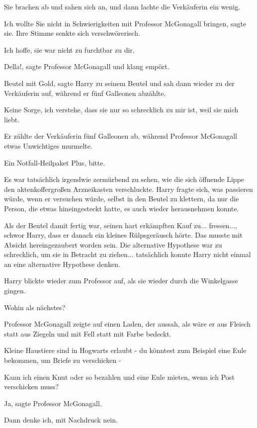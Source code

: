 Sie brachen ab und sahen sich an, und dann lachte die Verkäuferin ein wenig.

\glqq{}Ich wollte Sie nicht in Schwierigkeiten mit Professor McGonagall
bringen\grqq{}, sagte sie. Ihre Stimme senkte sich verschwörerisch.

\glqq{}Ich hoffe, sie war nicht zu furchtbar zu dir.\grqq{}

\glqq{}Della!\grqq{}, sagte Professor McGonagall und klang empört.

\glqq{}Beutel mit Gold\grqq{}, sagte Harry zu seinem Beutel und sah dann wieder
zu der Verkäuferin auf, während er fünf Galleonen abzählte.

\glqq{}Keine Sorge, ich verstehe, dass sie nur so schrecklich zu mir ist, weil
sie mich liebt.\grqq{}

Er zählte der Verkäuferin fünf Galleonen ab, während Professor McGonagall etwas
Unwichtiges murmelte.

\glqq{}Ein Notfall-Heilpaket Plus, bitte.\grqq{}

Es war tatsächlich irgendwie zermürbend zu sehen, wie die sich öffnende Lippe
den aktenkoffergroßen Arzneikasten verschluckte. Harry fragte sich, was
passieren würde, wenn er versuchen würde, selbst in den Beutel zu klettern, da
nur die Person, die etwas hineingesteckt hatte, es auch wieder herausnehmen
konnte.

Als der Beutel damit fertig war, seinen hart erkämpften Kauf zu... fressen...,
schwor Harry, dass er danach ein kleines Rülpsgeräusch hörte. Das musste mit
Absicht hereingezaubert worden sein. Die alternative Hypothese war zu
schrecklich, um sie in Betracht zu ziehen... tatsächlich konnte Harry nicht
einmal an eine alternative Hypothese denken.

Harry blickte wieder zum Professor auf, als sie wieder durch die Winkelgasse
gingen.

\glqq{}Wohin als nächstes?\grqq{}

Professor McGonagall zeigte auf einen Laden, der aussah, als wäre er aus Fleisch
statt aus Ziegeln und mit Fell statt mit Farbe bedeckt.

\glqq{}Kleine Haustiere sind in Hogwarts erlaubt - du könntest zum Beispiel eine
Eule bekommen, um Briefe zu verschicken -\grqq{}

\glqq{}Kann ich einen Knut oder so bezahlen und eine Eule mieten, wenn ich Post
verschicken muss?\grqq{}

\glqq{}Ja\grqq{}, sagte Professor McGonagall.

\glqq{}Dann denke ich, mit Nachdruck nein.\grqq{}

